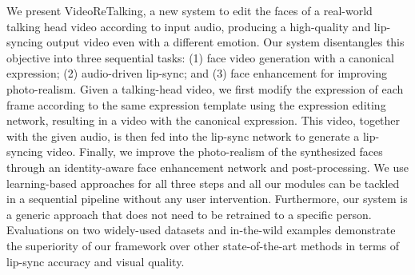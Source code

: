 We present VideoReTalking, a new system to edit the faces of a real-world talking head video according to input audio, producing a high-quality and lip-syncing output video even with a different emotion.
Our system disentangles this objective into three sequential tasks: (1) face video generation with a canonical expression; (2) audio-driven lip-sync; and (3) face enhancement for improving photo-realism. 
Given a talking-head video, we first modify the expression of each frame according to the same expression template using the expression editing network, resulting in a video with the canonical expression. This video, together with the given audio, is then fed into the lip-sync network to generate a lip-syncing video.
Finally, we improve the photo-realism of the synthesized faces through an identity-aware face enhancement network and post-processing.
We use learning-based approaches for all three steps and all our modules can be tackled in a sequential pipeline without any user intervention.
Furthermore, our system is a generic approach that does not need to be retrained to a specific person. 
Evaluations on two widely-used datasets and in-the-wild examples demonstrate the superiority of our framework over other state-of-the-art methods in terms of lip-sync accuracy and visual quality.
